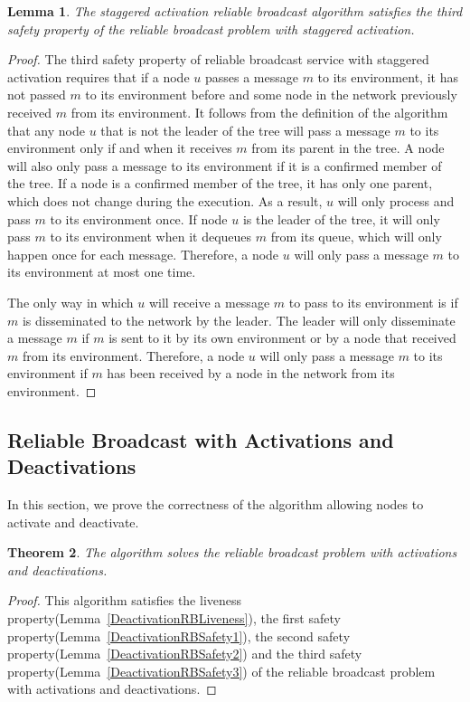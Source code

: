 \documentclass[english]{article}
\newtheorem{theorem}{Theorem}[section]
\newtheorem{lemma}[theorem]{Lemma}
\begin{document}
\begin{lemma}
\label{StaggeredRBSafety3}
The staggered activation reliable broadcast algorithm satisfies the third safety property of the reliable broadcast problem with staggered activation.
\end{lemma}
\begin{proof}

The third safety property of reliable broadcast service with staggered activation requires that if a node $u$ passes a message $m$ to its environment, it has not passed $m$ to its environment before and some node in the network previously received $m$ from its environment. It follows from the definition of  the algorithm that any node $u$ that is not the leader of the tree will pass a message $m$ to its environment only if and when it receives $m$ from its parent in the tree. A node will also only pass a message to its environment if it is a confirmed member of the tree. If a node is a confirmed member of the tree, it has only one parent, which does not change during the execution. As a result, $u$ will only process and pass $m$ to its environment once. If node $u$ is the leader of the tree, it will only pass $m$ to its environment when it dequeues $m$ from its queue, which will only happen once for each message. Therefore, a node $u$ will only pass a message $m$ to its environment at most one time.

The only way in which $u$ will receive a message $m$ to pass to its environment is if $m$ is disseminated to the network by the leader. The leader will only disseminate a message $m$ if $m$ is sent to it by its own environment or by a node that received $m$ from its environment. Therefore, a node $u$ will only pass a message $m$ to its environment if $m$ has been received by a node in the network from its environment.

\end{proof}



\subsection {Reliable Broadcast with Activations and Deactivations}

In this section, we prove the correctness of the algorithm allowing nodes to activate and deactivate.

\begin{theorem}
\label{DeactivationReliableBroadcast}
The algorithm solves the reliable broadcast problem with activations and deactivations.
\end{theorem}
\begin{proof}
This algorithm satisfies the liveness property(Lemma~\ref{DeactivationRBLiveness}), 
the first safety property(Lemma~\ref{DeactivationRBSafety1}),
the second safety property(Lemma~\ref{DeactivationRBSafety2}) and 
the third safety property(Lemma~\ref{DeactivationRBSafety3}) of the reliable broadcast problem with activations and deactivations.
\end{proof}
\end{document}

